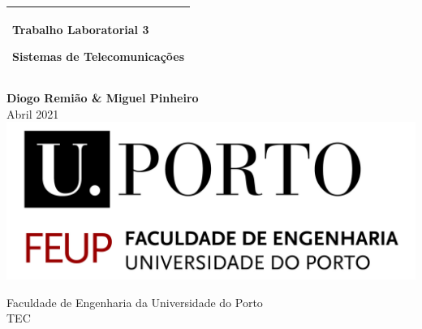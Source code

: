 %
%
%
%
%
\begin{titlepage}
  \addtolength{\hoffset}{0.5\evensidemargin-0.5\oddsidemargin} %
  \noindent%
  \begin{tabular}{@{}p{\textwidth}@{}}
    \toprule[2pt]
    \midrule
    \vspace{0.2cm}
    \begin{center}
    \Huge{\textbf{
        Trabalho Laboratorial 3 %
    }}
    \end{center}
    \begin{center}
      \Large{
        Sistemas de Telecomunicações%
      }
    \end{center}
    \vspace{0.2cm}\\
    \midrule
    \toprule[2pt]
  \end{tabular}
  \vspace{2cm}
  \begin{center}
    {\Large
      \textbf{Diogo Remião \& Miguel Pinheiro} \\ %
      \vspace{0.2cm}
      {\Large
    Abril 2021  %
    }\\
      \vspace{4cm}
      \includegraphics[width=.7\textwidth]{figs/feup/feup_logo.png}
    }
  \end{center}
  \vfill
  \begin{center}
  \vspace{0.5cm}
  Faculdade de Engenharia da Universidade do Porto\\
  TEC
  \end{center}
\end{titlepage}
\clearpage
